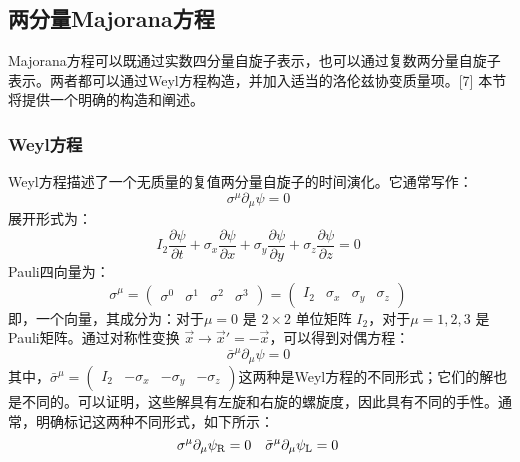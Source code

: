 \subsection{两分量Majorana方程}
Majorana方程可以既通过实数四分量自旋子表示，也可以通过复数两分量自旋子表示。两者都可以通过Weyl方程构造，并加入适当的洛伦兹协变质量项。[7] 本节将提供一个明确的构造和阐述。
\subsubsection{Weyl方程}
Weyl方程描述了一个无质量的复值两分量自旋子的时间演化。它通常写作：
\[
\sigma^{\mu} \partial_{\mu} \psi = 0~
\]
展开形式为：
\[
I_2 \frac{\partial \psi}{\partial t} + \sigma_x \frac{\partial \psi}{\partial x} + \sigma_y \frac{\partial \psi}{\partial y} + \sigma_z \frac{\partial \psi}{\partial z} = 0~
\]
Pauli四向量为：
\[
\sigma^{\mu} = \begin{pmatrix} \sigma^0 & \sigma^1 & \sigma^2 & \sigma^3 \end{pmatrix} = \begin{pmatrix} I_2 & \sigma_x & \sigma_y & \sigma_z \end{pmatrix}~
\]
即，一个向量，其成分为：对于\(\mu = 0\) 是 \(2 \times 2\) 单位矩阵 \(I_2\)，对于\(\mu = 1, 2, 3\) 是Pauli矩阵。通过对称性变换 \( \vec{x} \to \vec{x}' = -\vec{x} \)，可以得到对偶方程：
\[
\bar{\sigma}^{\mu} \partial_{\mu} \psi = 0~
\]
其中，\(\bar{\sigma}^{\mu} = \begin{pmatrix} I_2 & -\sigma_x &-\sigma_y & -\sigma_z \end{pmatrix}\)这两种是Weyl方程的不同形式；它们的解也是不同的。可以证明，这些解具有左旋和右旋的螺旋度，因此具有不同的手性。通常，明确标记这两种不同形式，如下所示：
\[
\sigma^{\mu} \partial_{\mu} \psi_{\rm {R}} = 0 \quad \bar{\sigma}^{\mu} \partial_{\mu} \psi_{\rm {L}} = 0~
\]